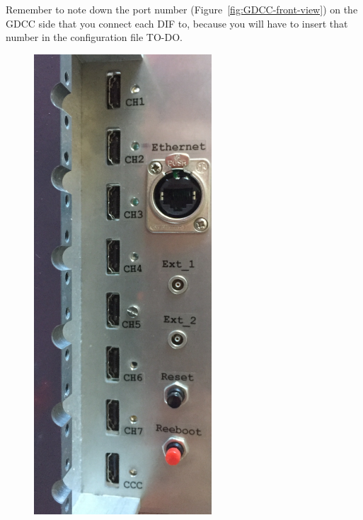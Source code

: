 Remember to note down the port number (Figure~\ref{fig:GDCC-front-view}) on the
GDCC side that you connect each DIF to, because you will have to insert that
number in the configuration file TO-DO.
\begin{figure}[H]
   \centering  
  \begin{minipage}{0.2\linewidth}
  \centering \includegraphics[width=0.9\linewidth, frame]{GDCC-front-view}

\end{minipage}
\end{figure}
